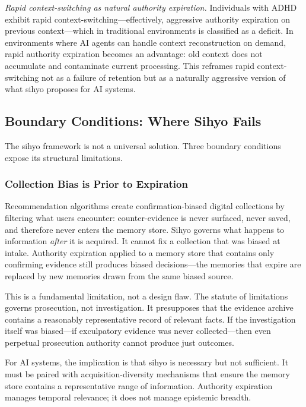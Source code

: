 \documentclass[12pt]{article}
\begin{document}
\emph{Rapid context-switching as natural authority expiration.} Individuals with ADHD exhibit rapid context-switching---effectively, aggressive authority expiration on previous context---which in traditional environments is classified as a deficit. In environments where AI agents can handle context reconstruction on demand, rapid authority expiration becomes an advantage: old context does not accumulate and contaminate current processing. This reframes rapid context-switching not as a failure of retention but as a naturally aggressive version of what sihyo proposes for AI systems.

\subsection{Boundary Conditions: Where Sihyo Fails}
\label{sec:boundary-conditions}

The sihyo framework is not a universal solution. Three boundary conditions expose its structural limitations.

\subsubsection{Collection Bias is Prior to Expiration}
\label{sec:collection-bias}

Recommendation algorithms create confirmation-biased digital collections by filtering what users encounter: counter-evidence is never surfaced, never saved, and therefore never enters the memory store. Sihyo governs what happens to information \emph{after} it is acquired. It cannot fix a collection that was biased at intake. Authority expiration applied to a memory store that contains only confirming evidence still produces biased decisions---the memories that expire are replaced by new memories drawn from the same biased source.

This is a fundamental limitation, not a design flaw. The statute of limitations governs prosecution, not investigation. It presupposes that the evidence archive contains a reasonably representative record of relevant facts. If the investigation itself was biased---if exculpatory evidence was never collected---then even perpetual prosecution authority cannot produce just outcomes.

For AI systems, the implication is that sihyo is necessary but not sufficient. It must be paired with acquisition-diversity mechanisms that ensure the memory store contains a representative range of information. Authority expiration manages temporal relevance; it does not manage epistemic breadth.
\end{document}
